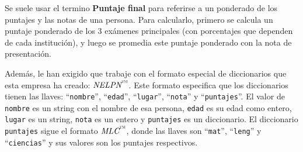 Se suele usar el termino \textbf{Puntaje final} para referirse a un ponderado de los puntajes y las notas de una persona. Para calcularlo, primero se calcula un puntaje ponderado de los 3 exámenes principales (con porcentajes que dependen de cada institución), y luego se promedia este puntaje ponderado con la nota de presentación.

Además, le han exigido que trabaje con el formato especial de diccionarios que esta empresa ha creado: $\textit{NELPN}^\text{\texttrademark}$. Este formato especifica que los diccionarios tienen las llaves: ``\texttt{nombre}'', ``\texttt{edad}'', ``\texttt{lugar}'', ``\texttt{nota}'' y ``\texttt{puntajes}''. El valor de \texttt{nombre} es un string con el nombre de esa persona, \texttt{edad} es su edad como entero, \texttt{lugar} es un string, \texttt{nota} es un entero y \texttt{puntajes} es un diccionario. El diccionario \texttt{puntajes} sigue el formato $\textit{MLC}^\text{\texttrademark}$, donde las llaves son ``\texttt{mat}'', ``\texttt{leng}'' y ``\texttt{ciencias}'' y sus valores son los puntajes respectivos.

